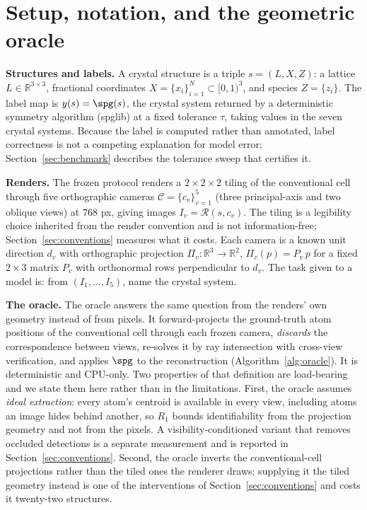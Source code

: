 \section{Setup, notation, and the geometric oracle}
\label{sec:setup}

\textbf{Structures and labels.} A crystal structure is a triple $s = (L, X, Z)$: a lattice
$L \in \mathbb{R}^{3\times3}$, fractional coordinates $X = \{x_i\}_{i=1}^{N} \subset [0,1)^3$, and species
$Z = \{z_i\}$. The label map is $y(s) = \spg(s)$, the crystal system returned by a deterministic symmetry
algorithm (spglib) at a fixed tolerance $\tau$, taking values in the seven crystal systems. Because the
label is computed rather than annotated, label correctness is not a competing explanation for model error;
Section~\ref{sec:benchmark} describes the tolerance sweep that certifies it.

\textbf{Renders.} The frozen protocol renders a $2\times2\times2$ tiling of the conventional cell through
five orthographic cameras $\mathcal{C} = \{c_v\}_{v=1}^{5}$ (three principal-axis and two oblique views) at
$768$ px, giving images $I_v = \mathcal{R}(s, c_v)$. The tiling is a legibility choice inherited from the
render convention and is not information-free; Section~\ref{sec:conventions} measures what it costs. Each camera is a known unit direction $d_v$ with orthographic projection
$\Pi_v : \mathbb{R}^3 \to \mathbb{R}^2$, $\Pi_v(p) = P_v\, p$ for a fixed $2\times3$ matrix $P_v$ with
orthonormal rows perpendicular to $d_v$. The task given to a model is: from $(I_1,\dots,I_5)$, name the
crystal system.

\textbf{The oracle.} The oracle answers the same question from the renders' own geometry instead of from
pixels. It forward-projects the ground-truth atom positions of the conventional cell through each frozen
camera, \emph{discards} the correspondence between views, re-solves it by ray intersection with cross-view
verification, and applies $\spg$ to the reconstruction (Algorithm~\ref{alg:oracle}). It is deterministic
and CPU-only. Two properties of that definition are load-bearing and we state them here rather than in the
limitations. First, the oracle assumes \emph{ideal extraction}: every atom's centroid is available in every
view, including atoms an image hides behind another, so $R_1$ bounds identifiability from the projection
geometry and not from the pixels. A visibility-conditioned variant that removes occluded detections is a
separate measurement and is reported in Section~\ref{sec:conventions}. Second, the oracle inverts the
conventional-cell projections rather than the tiled ones the renderer draws; supplying it the tiled geometry
instead is one of the interventions of Section~\ref{sec:conventions} and costs it twenty-two structures.

